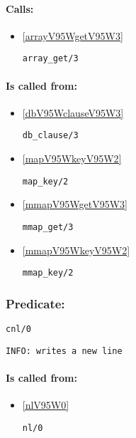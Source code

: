 \paragraph{Calls:} 
\begin{itemize}
\item \ref{arrayV95WgetV95W3} 
\begin{verbatim}
array_get/3
\end{verbatim}

\end{itemize}
\paragraph{Is called from:} 
\begin{itemize}
\item \ref{dbV95WclauseV95W3} 
\begin{verbatim}
db_clause/3
\end{verbatim}

\item \ref{mapV95WkeyV95W2} 
\begin{verbatim}
map_key/2
\end{verbatim}

\item \ref{mmapV95WgetV95W3} 
\begin{verbatim}
mmap_get/3
\end{verbatim}

\item \ref{mmapV95WkeyV95W2} 
\begin{verbatim}
mmap_key/2
\end{verbatim}

\end{itemize}

\subsubsection{Predicate:} \label{cnlV95W0}

\begin{verbatim}
cnl/0
\end{verbatim}

{\small \begin{verbatim}
INFO: writes a new line

\end{verbatim}}
\paragraph{Is called from:} 
\begin{itemize}
\item \ref{nlV95W0} 
\begin{verbatim}
nl/0
\end{verbatim}

\end{itemize}

